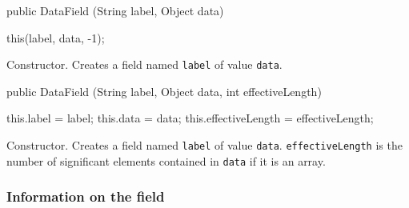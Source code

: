 \begin{code}
   public DataField (String label, Object data) \begin{hide} {
      this(label, data, -1);
   }
   \end{hide}
\end{code}
\begin{tabb}
Constructor. Creates a field named \texttt{label} of value \texttt{data}.
\end{tabb}
\begin{htmlonly}
\end{htmlonly}
\begin{code}
   
   public DataField (String label, Object data, int effectiveLength) \begin{hide} {
      this.label = label;
      this.data = data;
      this.effectiveLength = effectiveLength;
   }
   \end{hide}
\end{code}
\begin{tabb}
Constructor. Creates a field named \texttt{label} of value \texttt{data}.
 \texttt{effectiveLength} is the number of significant elements contained in
 \texttt{data} if it is an array.
\end{tabb}
\begin{htmlonly}
\end{htmlonly}


\subsubsection*{Information on the field}

